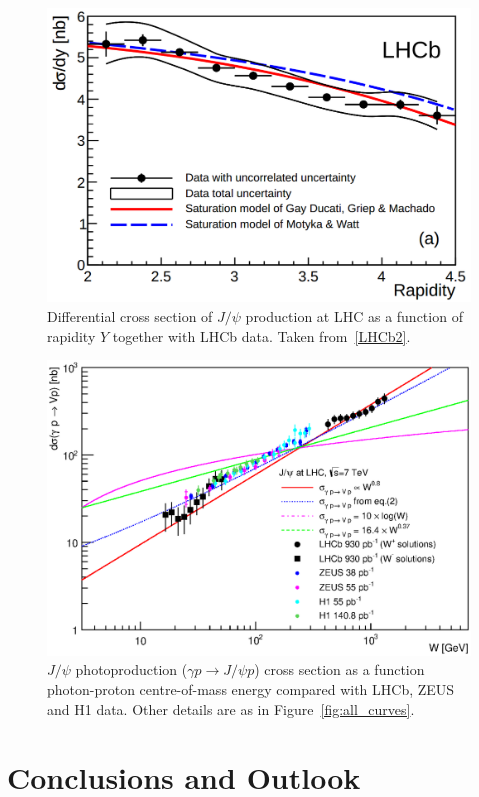 \documentclass[12pt]{article}
\begin{document}
\begin{figure}[p]
\centering
 \includegraphics[width=.8\textwidth]{figures/Magno.png}
 \caption{Differential cross section of $J/\psi$ production at LHC as a function of rapidity $Y$ together with LHCb data.
         Taken from~\ref{LHCb2}.}
 \label{fig:dipole}
\end{figure}

\clearpage

\begin{figure}[!t]
\centering
 \includegraphics[width=.8\textwidth]{figures/sigma_gamma_p_W_all_theory.eps}
 \caption{$J/\psi$ photoproduction ($\gamma p \to J/\psi p$) cross section as a function photon-proton centre-of-mass energy compared
           with LHCb, ZEUS and H1 data. Other details are as in Figure~\ref{fig:all_curves}.}
 \label{fig:all_curves_w}
\end{figure}

\section{Conclusions and Outlook}
\end{document}
